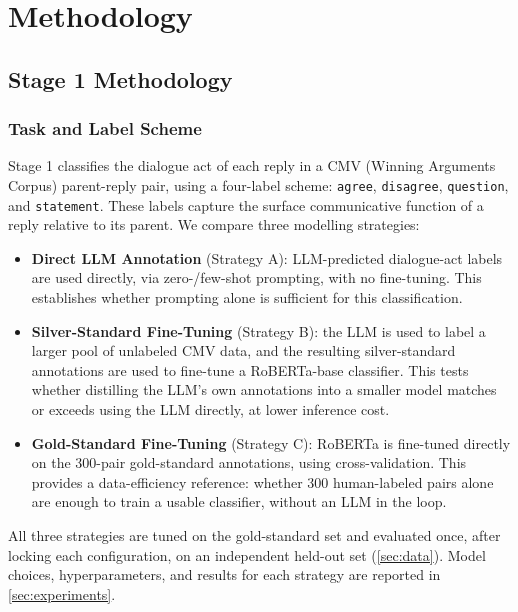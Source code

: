 \chapter{Methodology}
\label{k:methodology}

\section{Stage 1 Methodology}

\subsection{Task and Label Scheme}

Stage 1 classifies the dialogue act of each reply in a CMV (Winning
Arguments Corpus) parent-reply pair, using a four-label scheme:
\texttt{agree}, \texttt{disagree}, \texttt{question}, and
\texttt{statement}. These labels capture the surface communicative
function of a reply relative to its parent. We compare three modelling
strategies:

\begin{itemize}
\item \textbf{Direct LLM Annotation} (Strategy A): LLM-predicted
      dialogue-act labels are used directly, via zero-/few-shot
      prompting, with no fine-tuning. This establishes whether prompting
      alone is sufficient for this classification.
\item \textbf{Silver-Standard Fine-Tuning} (Strategy B): the LLM is
      used to label a larger pool of unlabeled CMV data, and the
      resulting silver-standard annotations are used to fine-tune a
      RoBERTa-base classifier. This tests whether distilling the LLM's
      own annotations into a smaller model matches or exceeds using the
      LLM directly, at lower inference cost.
\item \textbf{Gold-Standard Fine-Tuning} (Strategy C): RoBERTa is
      fine-tuned directly on the 300-pair gold-standard annotations,
      using cross-validation. This provides a data-efficiency reference:
      whether 300 human-labeled pairs alone are enough to train a usable
      classifier, without an LLM in the loop.
\end{itemize}

All three strategies are tuned on the gold-standard set and evaluated
once, after locking each configuration, on an independent held-out set
(\autoref{sec:data}). Model choices, hyperparameters, and results for
each strategy are reported in \autoref{sec:experiments}.

